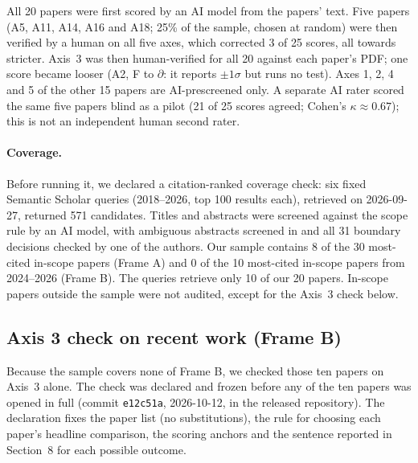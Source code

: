 \documentclass{article}
\begin{document}
All 20 papers were first scored by an AI model from the papers' text. Five papers (A5, A11, A14, A16
and A18; 25\% of the sample, chosen at random) were then verified by a human on all five axes, which
corrected 3 of 25 scores, all towards stricter. Axis~3 was then human-verified for all 20 against each
paper's PDF; one score became looser (A2, F to $\partial$: it reports $\pm1\sigma$ but runs no test).
Axes 1, 2, 4 and 5 of the other 15 papers are AI-prescreened only. A separate AI rater scored the same
five papers blind as a pilot (21 of 25 scores agreed; Cohen's $\kappa \approx 0.67$); this is not an
independent human second rater.

\paragraph{Coverage.} Before running it, we declared a citation-ranked coverage check: six fixed Semantic
Scholar queries (2018--2026, top 100 results each), retrieved on 2026-09-27, returned 571 candidates.
Titles and abstracts were screened against the scope rule by an AI model, with ambiguous abstracts
screened in and all 31 boundary decisions checked by one of the authors. Our sample contains 8 of the
30 most-cited in-scope papers (Frame A) and 0 of the 10 most-cited in-scope papers from 2024--2026
(Frame B). The queries retrieve only 10 of our 20 papers. In-scope papers outside the sample were not
audited, except for the Axis~3 check below.

\begin{table}[t]
\caption{Per-paper audit scores for the 20 papers. ``Verified'' gives the axes checked by a human
against the paper; the other axes are AI-prescreened.}
\label{tab:audit-per-paper}
\centering
\small

\end{table}

\subsection{Axis 3 check on recent work (Frame B)}
\label{app:frameb}
Because the sample covers none of Frame B, we checked those ten papers on Axis~3 alone. The check
was declared and frozen before any of the ten papers was opened in full (commit \texttt{e12c51a},
2026-10-12, in the released repository). The declaration fixes the paper list (no substitutions),
the rule for choosing each paper's headline comparison, the scoring anchors and the sentence
reported in Section~8 for each possible outcome.
\end{document}
